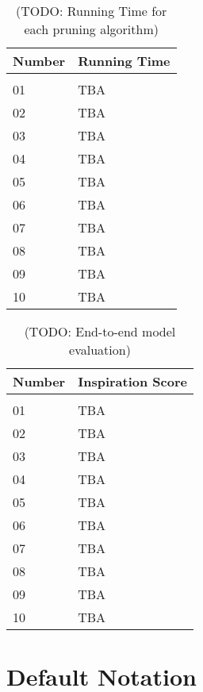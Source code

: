 \documentclass{article} %
\begin{document}
\begin{table}[t]
\caption{(TODO: Running Time for each pruning algorithm)}
\label{sample-table-7}
\begin{center}
\begin{tabular}{ll}
\multicolumn{1}{c}{\bf Number}  &\multicolumn{1}{c}{\bf Running Time}
\\ \hline \\
01         &TBA \\
02         &TBA \\
03         &TBA \\
04         &TBA \\
05         &TBA \\
06         &TBA \\
07         &TBA \\
08         &TBA \\
09         &TBA \\
10         &TBA \\
\end{tabular}
\end{center}
\end{table}

\begin{table}[t]
\caption{(TODO: End-to-end model evaluation)}
\label{sample-table-8}
\begin{center}
\begin{tabular}{ll}
\multicolumn{1}{c}{\bf Number}  &\multicolumn{1}{c}{\bf Inspiration Score}
\\ \hline \\
01         &TBA \\
02         &TBA \\
03         &TBA \\
04         &TBA \\
05         &TBA \\
06         &TBA \\
07         &TBA \\
08         &TBA \\
09         &TBA \\
10         &TBA \\
\end{tabular}
\end{center}
\end{table}

\section{Default Notation}
\end{document}
